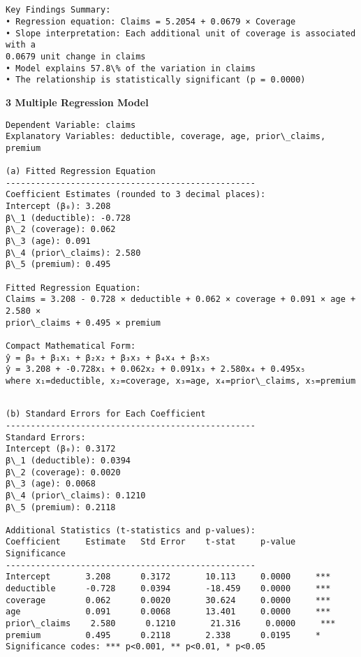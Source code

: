 \documentclass[8pt, twocolumn]{extarticle}
\begin{document}
    \begin{Verbatim}[commandchars=\\\{\}]


Key Findings Summary:
• Regression equation: Claims = 5.2054 + 0.0679 × Coverage
• Slope interpretation: Each additional unit of coverage is associated with a
0.0679 unit change in claims
• Model explains 57.8\% of the variation in claims
• The relationship is statistically significant (p = 0.0000)
    \end{Verbatim}
    \textbf{3 Multiple Regression Model}
    \begin{Verbatim}[commandchars=\\\{\}]
Dependent Variable: claims
Explanatory Variables: deductible, coverage, age, prior\_claims, premium

(a) Fitted Regression Equation
--------------------------------------------------
Coefficient Estimates (rounded to 3 decimal places):
Intercept (β₀): 3.208
β\_1 (deductible): -0.728
β\_2 (coverage): 0.062
β\_3 (age): 0.091
β\_4 (prior\_claims): 2.580
β\_5 (premium): 0.495

Fitted Regression Equation:
Claims = 3.208 - 0.728 × deductible + 0.062 × coverage + 0.091 × age + 2.580 ×
prior\_claims + 0.495 × premium

Compact Mathematical Form:
ŷ = β₀ + β₁x₁ + β₂x₂ + β₃x₃ + β₄x₄ + β₅x₅
ŷ = 3.208 + -0.728x₁ + 0.062x₂ + 0.091x₃ + 2.580x₄ + 0.495x₅
where x₁=deductible, x₂=coverage, x₃=age, x₄=prior\_claims, x₅=premium
    \end{Verbatim}

    \begin{Verbatim}[commandchars=\\\{\}]

(b) Standard Errors for Each Coefficient
--------------------------------------------------
Standard Errors:
Intercept (β₀): 0.3172
β\_1 (deductible): 0.0394
β\_2 (coverage): 0.0020
β\_3 (age): 0.0068
β\_4 (prior\_claims): 0.1210
β\_5 (premium): 0.2118

Additional Statistics (t-statistics and p-values):
Coefficient     Estimate   Std Error    t-stat     p-value    Significance
--------------------------------------------------
Intercept       3.208      0.3172       10.113     0.0000     ***
deductible      -0.728     0.0394       -18.459    0.0000     ***
coverage        0.062      0.0020       30.624     0.0000     ***
age             0.091      0.0068       13.401     0.0000     ***
prior\_claims    2.580      0.1210       21.316     0.0000     ***
premium         0.495      0.2118       2.338      0.0195     *
Significance codes: *** p<0.001, ** p<0.01, * p<0.05
    \end{Verbatim}
\end{document}

